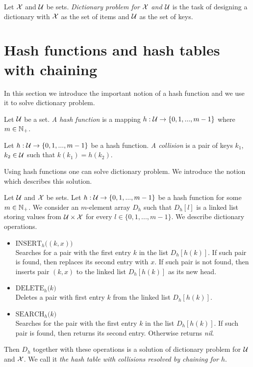 \begin{definition}
Let ${\mathcal X}$ and ${\mathcal U}$ be sets. \textit{Dictionary problem for ${\mathcal X}$ and ${\mathcal U}$} is the task of designing a dictionary with ${\mathcal X}$ as the set of items and ${\mathcal U}$ as the set of keys.
\end{definition}

\section{Hash functions and hash tables with chaining}
\noindent
In this section we introduce the important notion of a hash function and we use it to solve dictionary problem.

\begin{definition}
Let ${\mathcal U}$ be a set. \textit{A hash function} is a mapping $h:{\mathcal U}\rightarrow \{0,1,...,m-1\}$ where $m\in {\mathbb N}_+$.
\end{definition}

\begin{definition}
Let $h:{\mathcal U} \rightarrow \{0,1,...,m-1\}$ be a hash function. \textit{A collision} is a pair of keys $k_1$, $k_2\in {\mathcal U}$ such that $k(k_1) = h(k_2)$.
\end{definition}
\noindent
Using hash functions one can solve dictionary problem. We introduce the notion which describes this solution. 

\begin{definition}
Let ${\mathcal U}$ and ${\mathcal X}$ be sets. Let $h:{\mathcal U}\rightarrow \{0,1,...,m-1\}$ be a hash function for some $m\in {\mathbb N}_+$. We consider an $m$-element array $D_h$ such that $D_h[l]$ is a linked list storing values from ${\mathcal U}\times {\mathcal X}$ for every $l\in \{0,1,...,m-1\}$. We describe dictionary operations.
\begin{itemize}
\item[] $\textrm{INSERT}_h\big((k,x)\big)$\\
Searches for a pair with the first entry $k$ in the list $D_h[h(k)]$. If such pair is found, then replaces its second entry with $x$. If such pair is not found, then inserts pair $(k,x)$ to the linked list $D_h[h(k)]$ as its new head.
\item[] $\textrm{DELETE}_h\big(k\big)$\\
Deletes a pair with first entry $k$ from the linked list $D_h[h(k)]$.
\item[] $\textrm{SEARCH}_h\big(k\big)$\\
Searches for the pair with the first entry $k$ in the list $D_h[h(k)]$. If such pair is found, then returns its second entry. Otherwise returns \textit{nil}. 
\end{itemize}
Then $D_h$ together with these operations is a solution of dictionary problem for ${\mathcal U}$ and ${\mathcal X}$. We call it \textit{the hash table with collisions resolved by chaining for $h$}.
\end{definition}

